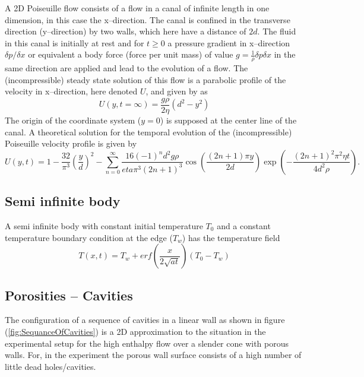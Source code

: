 \documentclass{report}
\begin{document}
A 2D Poiseuille flow consists of a flow in a canal of infinite length in one dimension, in this case the x--direction. The canal is confined  in the transverse direction (y--direction) by two walls, which here have a distance of $2d$. The fluid in this canal is initially at rest and for $t\geq0$ a pressure gradient in x--direction $\delta p/\delta x $ or equivalent a body force (force per unit mass) of value $g=\frac{1}{\rho}{\delta p}{\delta x}$ \cite{Sigalotti2003} in the same direction are applied and lead to the evolution of a flow. The (incompressible) steady state solution of this flow is a parabolic profile of the velocity in x--direction, here denoted $U$, and given by \cite{Sigalotti2003} as
\begin{equation}
\label{eq:Poiseuille_steadyState_U}
 U(y,t=\infty)=\frac{g \rho}{2 \eta}(d^2-y^2)
\end{equation}
The origin of the coordinate system ($y=0$) is supposed at the center line of the canal.
A theoretical solution for the temporal evolution of the (incompressible) Poiseuille velocity profile is given by \cite{Sigalotti2003}
\begin{equation}
\label{eq:Poiseuille_Series}
 U(y,t)=1-\frac{32}{\pi^3}\left(\frac{y}{d}\right)^2 -\sum_{n=0}^\infty \frac{16(-1)^n d^2 g \rho}{eta \pi^3 (2 n +1)^3}\cos \left(\frac{(2n+1)\pi y}{2 d} \right)\exp \left(- \frac{(2n+1)^2\pi^2\eta t}{4d^2\rho} \right).
\end{equation}
 

\subsection{Semi infinite body}
\label{sec:genIntroSemiInfBody}
A semi infinite body with constant initial temperature $T_0$  and a constant temperature boundary condition at the edge ($T_w$) has the temperature field \cite{Carslaw1959}
\begin{equation}
\label{eq:SemiInfBodySolution}
 T(x,t)=T_w+erf \left(\frac{x}{2 \sqrt{at}} \right) \left(T_0-T_w \right)
\end{equation}


\subsection{Porosities -- Cavities}
\label{sec:Porosities_Cavity}
The configuration of a sequence of cavities in a linear wall as shown in figure (\ref{fig:SequanceOfCavities}) is a 2D approximation to the situation in the experimental setup for the high enthalpy flow over a slender cone with porous walls. For, in the experiment the porous wall surface consists of a high number of little dead holes/cavities.
\end{document}
